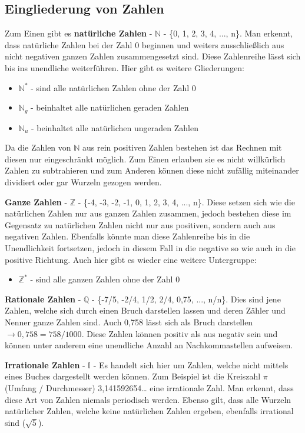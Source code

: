 \documentclass[german,12pt,a4paper]{article}
\begin{document}
\subsection{Eingliederung von Zahlen}
Zum Einen gibt es \textbf{natürliche Zahlen} - $\mathbb{N}$ - \{0, 1, 2, 3, 4, ..., n\}. Man erkennt, dass natürliche Zahlen bei der Zahl 0 beginnen und weiters ausschließlich aus nicht negativen ganzen Zahlen zusammengesetzt sind. Diese Zahlenreihe lässt sich bis ins unendliche weiterführen. Hier gibt es weitere Gliederungen:\
\begin{itemize}
\item $\mathbb{N}^*$ - sind alle natürlichen Zahlen ohne der Zahl 0
\item $\mathbb{N}_g$ - beinhaltet alle natürlichen geraden Zahlen
\item $\mathbb{N}_u$ - beinhaltet alle natürlichen ungeraden Zahlen
\end{itemize}
Da die Zahlen von $\mathbb{N}$ aus rein positiven Zahlen bestehen ist das Rechnen mit diesen nur eingeschränkt möglich. Zum Einen erlauben sie es nicht willkürlich Zahlen zu subtrahieren und zum Anderen können diese nicht zufällig miteinander dividiert oder gar Wurzeln gezogen werden.

\textbf{Ganze Zahlen} - $\mathbb{Z}$ - \{-4, -3, -2, -1, 0, 1, 2, 3, 4, ..., n\}. Diese setzen sich wie die natürlichen Zahlen nur aus ganzen Zahlen zusammen, jedoch bestehen diese im Gegensatz zu natürlichen Zahlen nicht nur aus positiven, sondern auch aus negativen Zahlen. Ebenfalls könnte man diese Zahlenreihe bis in die Unendlichkeit fortsetzen, jedoch in diesem Fall in die negative so wie auch in die positive Richtung. Auch hier gibt es wieder eine weitere Untergruppe:\
\begin{itemize}
\item $\mathbb{Z}^*$ - sind alle ganzen Zahlen ohne der Zahl 0
\end{itemize}

\textbf{Rationale Zahlen} - $\mathbb{Q}$ - \{-7/5, -2/4, 1/2, 2/4, 0,75, ..., n/n\}. Dies sind jene Zahlen, welche sich durch einen Bruch darstellen lassen und deren Zähler und Nenner ganze Zahlen sind. Auch 0,758 lässt sich als Bruch darstellen $\rightarrow{0,758 = 758/1000}$. Diese Zahlen können positiv als aus negativ sein und können unter anderem eine unendliche Anzahl an Nachkommastellen aufweisen.

\textbf{Irrationale Zahlen} - $\mathbb{I}$ - Es handelt sich hier um Zahlen, welche nicht mittels eines Buches dargestellt werden können. Zum Beispiel ist die Kreiszahl $\pi$ (Umfang / Durchmesser) 3,141592654… eine irrationale Zahl. Man erkennt, dass diese Art von Zahlen niemals periodisch werden. Ebenso gilt, dass alle Wurzeln natürlicher Zahlen, welche keine natürlichen Zahlen ergeben, ebenfalls irrational sind ($\sqrt{5}$).
\end{document}
